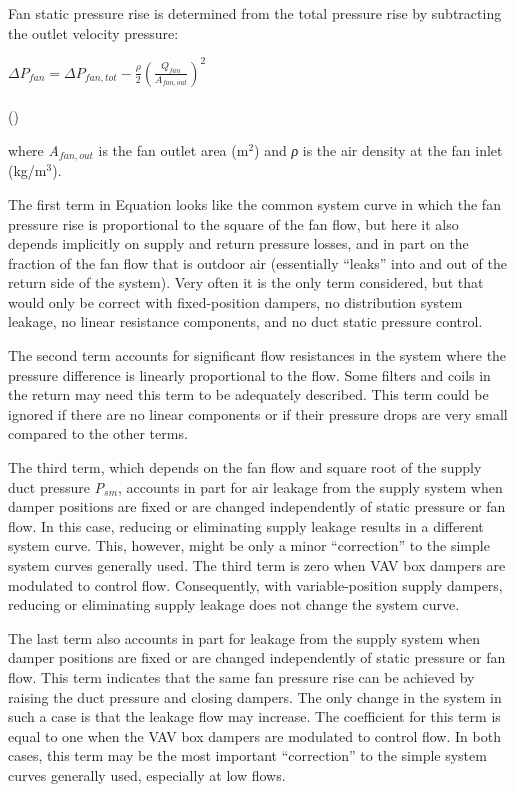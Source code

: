 Fan static pressure rise is determined from the total pressure rise by subtracting the outlet velocity pressure:

\(\Delta {P_{fan}} = \Delta {P_{fan,tot}} - \frac{\rho }{2}{\left( {\frac{{{Q_{fan}}}}{{{A_{fan,out}}}}} \right)^2}\) ~~~~~~~~~~~~~~~~~~~~~~~~~~~~~~~~~~~~~~~~~~~~~~~~~~~~~~~~~~~~~~~~~~~~~~~~ ()

where \emph{A\(_{fan,out}\)} is the fan outlet area (m\(^{2}\)) and \emph{ρ} is the air density at the fan inlet (kg/m\(^{3}\)).

The first term in Equation looks like the common system curve in which the fan pressure rise is proportional to the square of the fan flow, but here it also depends implicitly on supply and return pressure losses, and in part on the fraction of the fan flow that is outdoor air (essentially ``leaks'' into and out of the return side of the system). Very often it is the only term considered, but that would only be correct with fixed-position dampers, no distribution system leakage, no linear resistance components, and no duct static pressure control.

The second term accounts for significant flow resistances in the system where the pressure difference is linearly proportional to the flow. Some filters and coils in the return may need this term to be adequately described. This term could be ignored if there are no linear components or if their pressure drops are very small compared to the other terms.

The third term, which depends on the fan flow and square root of the supply duct pressure \emph{P\(_{sm}\)}, accounts in part for air leakage from the supply system when damper positions are fixed or are changed independently of static pressure or fan flow. In this case, reducing or eliminating supply leakage results in a different system curve. This, however, might be only a minor ``correction'' to the simple system curves generally used. The third term is zero when VAV box dampers are modulated to control flow. Consequently, with variable-position supply dampers, reducing or eliminating supply leakage does not change the system curve.

The last term also accounts in part for leakage from the supply system when damper positions are fixed or are changed independently of static pressure or fan flow. This term indicates that the same fan pressure rise can be achieved by raising the duct pressure and closing dampers. The only change in the system in such a case is that the leakage flow may increase. The coefficient for this term is equal to one when the VAV box dampers are modulated to control flow. In both cases, this term may be the most important ``correction'' to the simple system curves generally used, especially at low flows.

